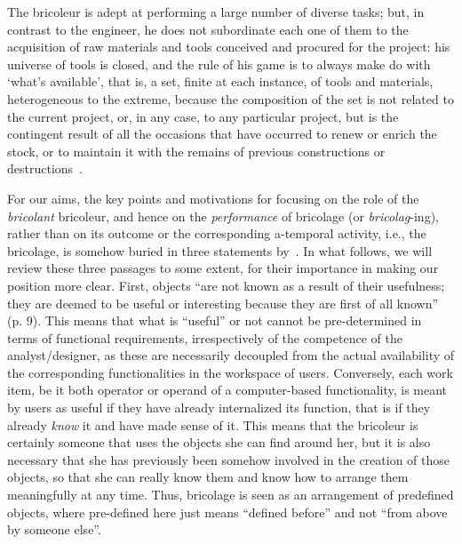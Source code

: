 \documentclass{article}
\let\origquotation\quotation
\let\endorigquotation\endquotation
\renewenvironment{quotation}{\vspace{-0.5\parskip}
  \origquotation
  \footnotesize
}{\endorigquotation}
\begin{document}
\begin{quotation}
The bricoleur is adept at performing a large number of diverse tasks; but, in contrast to the engineer, he does not subordinate each one of them to the acquisition of raw materials and tools conceived and procured for the project: his universe of tools is closed, and the rule of his game is to always make do with `what's available', that is, a set, finite at each instance, of tools and materials, heterogeneous to the extreme, because the composition of the set is not related to the current project, or, in any case, to any particular project, but is the contingent result of all the occasions that have occurred to renew or enrich the stock, or to maintain it with the remains of previous constructions or destructions~\citep[p. 17]{levi-strauss_savage_1966}.
\end{quotation}







For our aims, the key points and motivations for focusing on the role of the \emph{bricolant} bricoleur, and hence on the \emph{performance} of bricolage (or \emph{bricolag}-ing), rather than on its outcome or the corresponding a-temporal activity, i.e., the bricolage, is somehow buried in three statements by~\citet{levi-strauss_savage_1966}. In what follows, we will review these three passages to some extent, for their importance in making our position more clear. First, objects ``are not known as a result of their usefulness; they are deemed to be useful or interesting because they are first of all known'' (p. 9). This means that what is ``useful'' or not cannot be pre-determined in terms of functional requirements, irrespectively of the competence of the analyst/designer, as these are necessarily decoupled from the actual availability of the corresponding functionalities in the workspace of users. Conversely, each work item, be it both operator or operand of a computer-based functionality, is meant by users as useful if they have already internalized its function, that is if they already \emph{know} it and have made sense of it. This means that the bricoleur is certainly someone that uses the objects she can find around her, but it is also necessary that she has previously been somehow involved in the creation of those objects, so that she can really know them and know how to arrange them meaningfully at any time. Thus, bricolage is seen as an arrangement of predefined objects, where pre-defined here just means ``defined before'' and not ``from above by someone else''.
\end{document}
